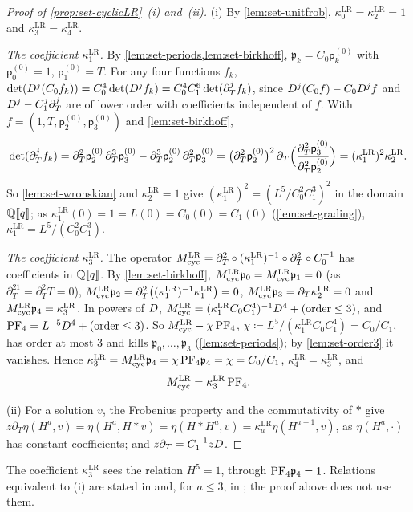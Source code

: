 \begin{proof}[Proof of \cref{prop:set-cyclicLR}~(i) and~(ii)]
(i) By \cref{lem:set-unitfrob}, $\kappa^{\mathrm{LR}}_0=\kappa^{\mathrm{LR}}_2=1$ and $\kappa^{\mathrm{LR}}_3=\kappa^{\mathrm{LR}}_4$.

\emph{The coefficient $\kappa^{\mathrm{LR}}_1$.} By \cref{lem:set-periods,lem:set-birkhoff}, $\mathfrak p_k=C_0\mathsf p^{(0)}_k$ with $\mathsf p^{(0)}_0=1$, $\mathsf p^{(0)}_1=T$. For any four functions $f_k$, $\det(D^j(C_0f_k))=C_0^4\det(D^jf_k)=C_0^4C_1^6\det(\partial_T^jf_k)$, since $D^j(C_0f)-C_0D^jf$ and $D^j-C_1^j\partial_T^j$ are of lower order with coefficients independent of $f$. With $f=(1,T,\mathsf p^{(0)}_2,\mathsf p^{(0)}_3)$ and \cref{lem:set-birkhoff},
\[
\det(\partial_T^jf_k)=\partial_T^2\mathsf p^{(0)}_2\,\partial_T^3\mathsf p^{(0)}_3-\partial_T^3\mathsf p^{(0)}_2\,\partial_T^2\mathsf p^{(0)}_3=\bigl(\partial_T^2\mathsf p^{(0)}_2\bigr)^2\,\partial_T\Bigl(\frac{\partial_T^2\mathsf p^{(0)}_3}{\partial_T^2\mathsf p^{(0)}_2}\Bigr)=(\kappa^{\mathrm{LR}}_1)^2\kappa^{\mathrm{LR}}_2 .
\]
So \cref{lem:set-wronskian} and $\kappa^{\mathrm{LR}}_2=1$ give $(\kappa^{\mathrm{LR}}_1)^2=(L^5/C_0^2C_1^3)^2$ in the domain $\mathbb{Q}[\![ q ]\!]$; as $\kappa^{\mathrm{LR}}_1(0)=1=L(0)=C_0(0)=C_1(0)$ (\cref{lem:set-grading}), $\kappa^{\mathrm{LR}}_1=L^5/(C_0^2C_1^3)$.

\emph{The coefficient $\kappa^{\mathrm{LR}}_3$.} The operator $M_{\mathrm{cyc}}^{\mathrm{LR}}=\partial_T^2\circ(\kappa^{\mathrm{LR}}_1)^{-1}\circ\partial_T^2\circ C_0^{-1}$ has coefficients in $\mathbb{Q}[\![ q ]\!]$. By \cref{lem:set-birkhoff}, $M_{\mathrm{cyc}}^{\mathrm{LR}}\mathfrak p_0=M_{\mathrm{cyc}}^{\mathrm{LR}}\mathfrak p_1=0$ (as $\partial_T^21=\partial_T^2T=0$), $M_{\mathrm{cyc}}^{\mathrm{LR}}\mathfrak p_2=\partial_T^2\bigl((\kappa^{\mathrm{LR}}_1)^{-1}\kappa^{\mathrm{LR}}_1\bigr)=0$, $M_{\mathrm{cyc}}^{\mathrm{LR}}\mathfrak p_3=\partial_T\kappa^{\mathrm{LR}}_2=0$ and $M_{\mathrm{cyc}}^{\mathrm{LR}}\mathfrak p_4=\kappa^{\mathrm{LR}}_3$. In powers of $D$, $M_{\mathrm{cyc}}^{\mathrm{LR}}=(\kappa^{\mathrm{LR}}_1C_0C_1^4)^{-1}D^4+(\text{order}\leq3)$, and $\mathrm{PF}_{4}=L^{-5}D^4+(\text{order}\leq3)$. So $M_{\mathrm{cyc}}^{\mathrm{LR}}-\chi\,\mathrm{PF}_{4}$, $\chi\coloneqq L^5/(\kappa^{\mathrm{LR}}_1C_0C_1^4)=C_0/C_1$, has order at most $3$ and kills $\mathfrak p_0,\dots,\mathfrak p_3$ (\cref{lem:set-periods}); by \cref{lem:set-order3} it vanishes. Hence $\kappa^{\mathrm{LR}}_3=M_{\mathrm{cyc}}^{\mathrm{LR}}\mathfrak p_4=\chi\,\mathrm{PF}_{4}\mathfrak p_4=\chi=C_0/C_1$, $\kappa^{\mathrm{LR}}_4=\kappa^{\mathrm{LR}}_3$, and
\begin{equation}
\label{eq:set-McycLR}
M_{\mathrm{cyc}}^{\mathrm{LR}}=\kappa^{\mathrm{LR}}_3\,\mathrm{PF}_{4} .
\end{equation}

(ii) For a solution $v$, the Frobenius property and the commutativity of $*$ give $z\partial_T\eta(H^a,v)=\eta(H^a,H*v)=\eta(H*H^a,v)=\kappa^{\mathrm{LR}}_a\eta(H^{a+1},v)$, as $\eta(H^a,\cdot)$ has constant coefficients; and $z\partial_T=C_1^{-1}zD$.
\end{proof}

The coefficient $\kappa^{\mathrm{LR}}_3$ sees the relation $H^5=1$, through $\mathrm{PF}_{4}\mathfrak p_4=1$. Relations equivalent to (i) are stated in \cite[Props.~6.1--6.2]{GR19} and, for $a\leq3$, in \cite[Section~2.4.3, (17), and Section~2.4.4, (19)--(20)]{LP20}; the proof above does not use them.
